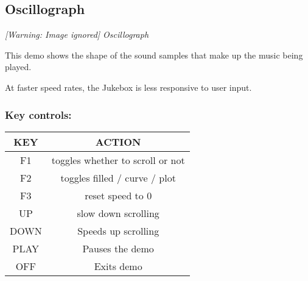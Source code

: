 \subsection{Oscillograph}
{\centering\itshape
  [Warning: Image ignored] %
 \newline
Oscillograph
\par}

This demo shows the shape of the sound samples that make up the music
being played.

At faster speed rates, the Jukebox is less responsive to user input.

\subsubsection{Key controls:}

\begin{table}[h!]
\begin{center}
\begin{tabular}{|c|c|}
\hline
KEY & ACTION \\\hline
F1 & toggles whether to scroll or not \\\hline
F2 & toggles filled / curve / plot \\\hline
F3 & reset speed to 0 \\\hline
UP & slow down scrolling \\\hline
DOWN & Speeds up scrolling \\\hline
PLAY & Pauses the demo \\\hline
OFF & Exits demo \\\hline
\end{tabular}
\end{center}
\end{table}

